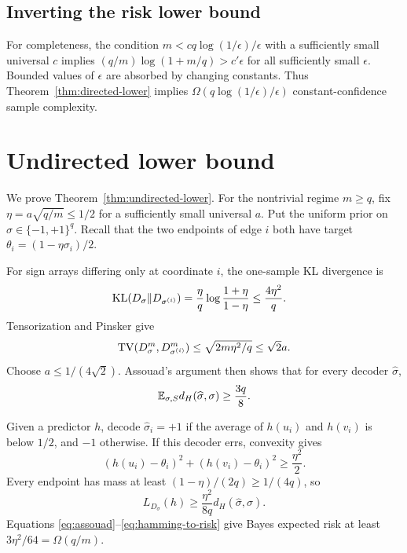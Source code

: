 \subsection{Inverting the risk lower bound}

For completeness, the condition
$m<cq\log(1/\epsilon)/\epsilon$ with a sufficiently small universal $c$ implies
$(q/m)\log(1+m/q)>c'\epsilon$ for all sufficiently small $\epsilon$. Bounded values of
$\epsilon$ are absorbed by changing constants. Thus Theorem~\ref{thm:directed-lower} implies
$\Omega(q\log(1/\epsilon)/\epsilon)$ constant-confidence sample complexity.

\section{Undirected lower bound}\label{app:undirected-lower}

We prove Theorem~\ref{thm:undirected-lower}. For the nontrivial regime $m\ge q$, fix
$\eta=a\sqrt{q/m}\le1/2$ for a sufficiently small universal $a$. Put the uniform prior on
$\sigma\in\{-1,+1\}^q$. Recall that the two endpoints of edge $i$ both have target
$\theta_i=(1-\eta\sigma_i)/2$.

For sign arrays differing only at coordinate $i$, the one-sample KL divergence is
\begin{align*}
 \operatorname{KL}(D_\sigma\|D_{\sigma^{(i)}})
 &=\frac{\eta}{q}\log\frac{1+\eta}{1-\eta}
 \le\frac{4\eta^2}{q}.
\end{align*}
Tensorization and Pinsker give
\[
 \operatorname{TV}(D_\sigma^m,D_{\sigma^{(i)}}^m)
 \le\sqrt{2m\eta^2/q}\le \sqrt2a.
\]
Choose $a\le1/(4\sqrt2)$. Assouad's argument then shows that for every decoder
$\widehat\sigma$,
\begin{equation}
 \mathbb E_{\sigma,S}d_H(\widehat\sigma,\sigma)\ge\frac{3q}{8}.
 \label{eq:assouad}
\end{equation}

Given a predictor $h$, decode $\widehat\sigma_i=+1$ if the average of $h(u_i)$ and $h(v_i)$ is
below $1/2$, and $-1$ otherwise. If this decoder errs, convexity gives
\[
 (h(u_i)-\theta_i)^2+(h(v_i)-\theta_i)^2\ge\frac{\eta^2}{2}.
\]
Every endpoint has mass at least $(1-\eta)/(2q)\ge1/(4q)$, so
\begin{equation}
 L_{D_\sigma}(h)\ge\frac{\eta^2}{8q}
 d_H(\widehat\sigma,\sigma).
 \label{eq:hamming-to-risk}
\end{equation}
Equations \eqref{eq:assouad}--\eqref{eq:hamming-to-risk} give Bayes expected risk at least
$3\eta^2/64=\Omega(q/m)$.

